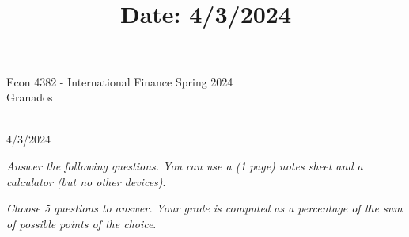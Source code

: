 \documentclass[11pt,dvipsnames]{article} %
\title{\vspace{-2.0cm}{\Large Exam \# 2 } \\ {\large Date: 4/3/2024 }  }
\author{}
\date{}
\newif \ifAnswers
\begin{document}
	
Econ 4382 - International Finance \hfill Spring 2024 \\
Granados \hfill \\[1.5cm]

\vspace*{-.25cm}

\ifAnswers
	\begin{center}
		{\vspace{-2.0cm}{\Large Exam \# 2 } \\[.2cm] {\normalsize Answer Key }  } %
	\end{center}
\else
	\begin{center}
		{\vspace{-2.0cm}{\Large Exam \# 2 } \\[.2cm] {\normalsize 4/3/2024 }  } %
	\end{center}
\fi
	






\textit{Answer the following questions. You can use a (1 page) notes sheet and a calculator (but no other devices)}.

\textit{Choose 5 questions to answer. Your grade is computed as a percentage of the sum of possible points of the choice}.
\end{document}

